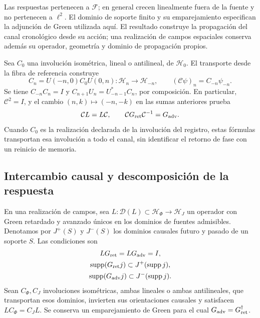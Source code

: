 Las respuestas pertenecen a \(\mathcal F\); en general crecen
linealmente fuera de la fuente y no pertenecen a \(\ell^2\).
El dominio de soporte finito y su emparejamiento especifican la adjunción
de Green utilizada aquí. El resultado construye la propagación del canal
cronológico desde su acción; una realización de campos espaciales conserva
además su operador, geometría y dominio de propagación propios.

Sea \(C_0\) una involución isométrica, lineal o antilineal, de
\(\mathcal H_0\). El transporte desde la fibra de referencia construye
\[
 C_n=U(-n,0)C_0U(0,n):\mathcal H_n\longrightarrow\mathcal H_{-n},
 \qquad (\mathcal C\psi)_n=C_{-n}\psi_{-n}.
\]
Se tiene \(C_{-n}C_n=I\) y
\(C_{n+1}U_n=U_{-n-1}^*C_n\), por composición.
En particular, \(\mathcal C^2=I\), y el cambio \((n,k)\mapsto(-n,-k)\)
en las sumas anteriores prueba
\begin{equation}
 \mathcal C L=L\mathcal C,\qquad
 \mathcal C G_{\rm ret}\mathcal C^{-1}=G_{\rm adv}.
 \label{vii:vii:eq:intercambio-green-cronologico}
\end{equation}
Cuando \(C_0\) es la realización declarada de la involución del registro,
estas fórmulas transportan esa involución a todo el canal, sin identificar
el retorno de fase con un reinicio de memoria.

\subsection{Intercambio causal y descomposición de la respuesta}
\label{vii:vii:subsec:green-realizacion-campos}

En una realización de campos, sea
\(L:\mathcal D(L)\subset\mathcal H_\Phi\to\mathcal H_J\)
un operador con Green retardado y avanzado únicos en los dominios de
fuentes admisibles. Denotamos por \(J^+(S)\) y \(J^-(S)\) los
dominios causales futuro y pasado de un soporte \(S\). Las condiciones son
\[
 \begin{gathered}
 LG_{\rm ret}=LG_{\rm adv}=I,\\
 \operatorname{supp}(G_{\rm ret}j)\subset J^+(\operatorname{supp}j),\\
 \operatorname{supp}(G_{\rm adv}j)\subset J^-(\operatorname{supp}j).
 \end{gathered}
\]
Sean \(C_\Phi,C_J\) involuciones isométricas, ambas lineales o ambas
antilineales, que transportan esos dominios,
invierten sus orientaciones causales y satisfacen
\(LC_\Phi=C_JL\). Se conserva un emparejamiento de Green para el cual
\(G_{\rm adv}=G_{\rm ret}^{\dagger}\).

